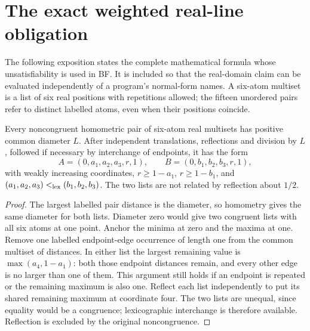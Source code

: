 \section{The exact weighted real-line obligation}\label{sec:linefull}

The following exposition states the complete mathematical formula whose
unsatisfiability is used in BF. It is included so that the real-domain
claim can be evaluated independently of a program's normal-form names.
A six-atom multiset is a list of six real positions with repetitions
allowed; the fifteen unordered pairs refer to distinct labelled atoms,
even when their positions coincide.

\begin{lemma}\label{lem:linenorm}
Every noncongruent homometric pair of six-atom real multisets has positive
common diameter $L$. After independent translations, reflections and
division by $L$, followed if necessary by interchange of endpoints, it
has the form
\[
 A=(0,a_1,a_2,a_3,r,1),\qquad B=(0,b_1,b_2,b_3,r,1),
\]
with weakly increasing coordinates, $r\ge1-a_1$, $r\ge1-b_1$, and
$(a_1,a_2,a_3)<_{\rm lex}(b_1,b_2,b_3)$. The two lists are not related
by reflection about $1/2$.
\end{lemma}
\begin{proof}
The largest labelled pair distance is the diameter, so homometry gives
the same diameter for both lists. Diameter zero would give two congruent
lists with all six atoms at one point. Anchor the minima at zero and
the maxima at one. Remove one labelled endpoint-edge occurrence of
length one from the common multiset of distances. In either list the
largest remaining value is $\max(a_4,1-a_1)$: both those endpoint
distances remain, and every other edge is no larger than one of them.
This argument still holds if an endpoint is repeated or the remaining
maximum is also one. Reflect each list independently to put its shared
remaining maximum at coordinate four. The two lists are unequal, since
equality would be a congruence; lexicographic interchange is therefore
available. Reflection is excluded by the original noncongruence.
\end{proof}

